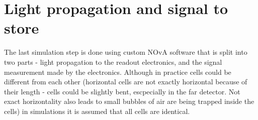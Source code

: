 
\section{Light propagation and signal to store}
The last simulation step is done using custom NOvA software that is split into two parts - light
propagation to the readout electronics, and the signal measurement made by the electronics. Although in practice cells could 
be different from each other (horizontal cells are not exactly horizontal because of their length - cells could be
slightly bent, escpecially in the far detector. Not exact horizontality also leads to small bubbles of air are
being trapped inside the cells) in simulations it is assumed that all cells are identical.

